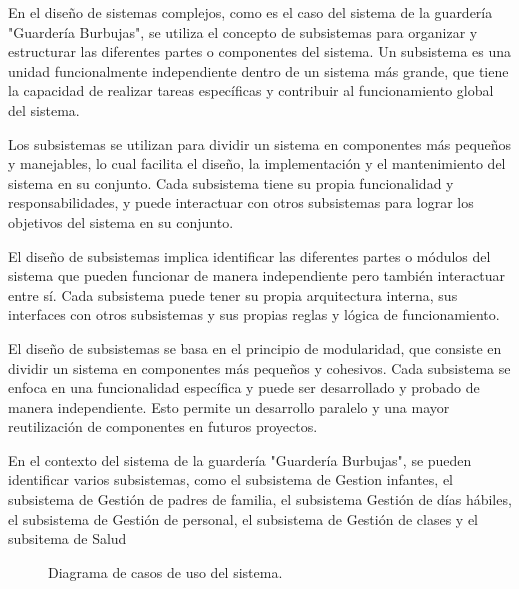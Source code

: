 En el diseño de sistemas complejos, como es el caso del sistema de la guardería "Guardería Burbujas", se utiliza el concepto de subsistemas para organizar y estructurar las diferentes partes o componentes del sistema. Un subsistema es una unidad funcionalmente independiente dentro de un sistema más grande, que tiene la capacidad de realizar tareas específicas y contribuir al funcionamiento global del sistema.

Los subsistemas se utilizan para dividir un sistema en componentes más pequeños y manejables, lo cual facilita el diseño, la implementación y el mantenimiento del sistema en su conjunto. Cada subsistema tiene su propia funcionalidad y responsabilidades, y puede interactuar con otros subsistemas para lograr los objetivos del sistema en su conjunto.

El diseño de subsistemas implica identificar las diferentes partes o módulos del sistema que pueden funcionar de manera independiente pero también interactuar entre sí. Cada subsistema puede tener su propia arquitectura interna, sus interfaces con otros subsistemas y sus propias reglas y lógica de funcionamiento.

El diseño de subsistemas se basa en el principio de modularidad, que consiste en dividir un sistema en componentes más pequeños y cohesivos. Cada subsistema se enfoca en una funcionalidad específica y puede ser desarrollado y probado de manera independiente. Esto permite un desarrollo paralelo y una mayor reutilización de componentes en futuros proyectos.

En el contexto del sistema de la guardería "Guardería Burbujas", se pueden identificar varios subsistemas, como el subsistema de Gestion infantes, el subsistema de Gestión de padres de familia, el subsistema Gestión de días hábiles, el subsistema de Gestión de personal, el subsistema de Gestión de clases y el subsitema de Salud

\begin{figure}[htbp]
	\begin{center}
		\caption{Diagrama de casos de uso del sistema.}
		\label{fig:casosDeUso}
	\end{center}
\end{figure}

